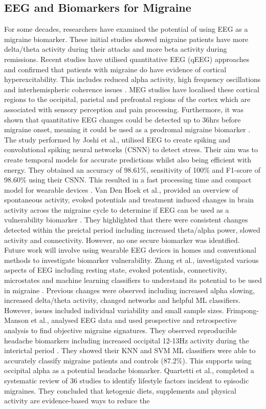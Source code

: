 \documentclass[12pt, a4paper]{report}
\begin{document}
\subsection{EEG and Biomarkers for Migraine}
\label{subsec:lit_eeg_biomarkers}
For some decades, researchers have examined the potential of using EEG as a migraine biomarker. These initial studies showed migraine patients have more delta/theta activity during their attacks and more beta activity during remissions. Recent studies have utilised quantitative EEG (qEEG) approaches and confirmed that patients with migraine do have evidence of cortical hyperexcitability. This includes reduced alpha activity, high frequency oscillations and interhemispheric coherence issues  \cite{VanDenHoek2024}. MEG studies have localised these cortical regions to the occipital, parietal and prefrontal regions of the cortex which are associated with sensory perception and pain processing. Furthermore, it was shown that quantitative EEG changes could be detected up to 36hrs before migraine onset, meaning it could be used as a prodromal migraine biomarker  \cite{Kim2023}. The study performed by Joshi et al., utilised EEG to create spiking and convolutional spiking neural networks (CSNN) to detect stress. Their aim was to create temporal models for accurate predictions whilst also being efficient with energy. They obtained an accuracy of 98.61\%, sensitivity of 100\% and F1-score of 98.60\% using their CSNN. This resulted in a fast processing time and compact model for wearable devices \cite{JoshiMatharu2025}. Van Den Hoek et al., provided an overview of spontaneous activity, evoked potentials and treatment induced changes in brain activity across the migraine cycle to determine if EEG can be used as a vulnerability biomarker \cite{VanDenHoek2024}. They highlighted that there were consistent changes detected within the preictal period including increased theta/alpha power, slowed activity and connectivity. However, no one secure biomarker was identified. Future work will involve using wearable EEG devices in homes and conventional methods to investigate biomarker vulnerability. Zhang et al., investigated various aspects of EEG including resting state, evoked potentials, connectivity, microstates and machine learning classifiers to understand its potential to be used in migraine \cite{Zhang2023}. Previous changes were observed including increased alpha slowing, increased delta/theta activity, changed networks and helpful ML classifiers. However, issues included individual variability and small sample sizes. Frimpong-Manson et al., analysed EEG data and used prospective and retrospective analysis to find objective migraine signatures. They observed reproducible headache biomarkers including increased occipital 12-13Hz activity during the interictal period \cite{FrimpongManson2024}. They showed their KNN and SVM ML classifiers were able to accurately classify migraine patients and controls (87.2\%). This supports using occipital alpha as a potential headache biomarker. Quartetti et al., completed a systematic review of 36 studies to identify lifestyle factors incident to episodic migraines. They concluded that ketogenic diets, supplements and physical activity are evidence-based ways to reduce the 
\end{document}

